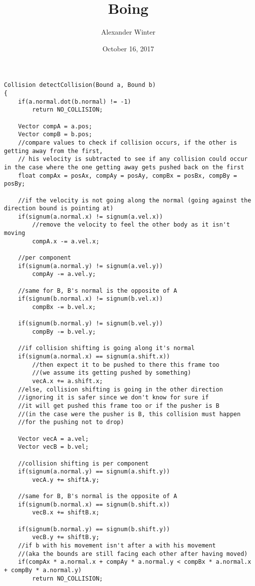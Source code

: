 \documentclass[12pt]{article}
\title{Boing}
\author{Alexander Winter}
\date{October 16, 2017}
\begin{document}
\maketitle
	
\newpage

\begin{lstlisting}
Collision detectCollision(Bound a, Bound b)
{
	if(a.normal.dot(b.normal) != -1)
		return NO_COLLISION;
	
	Vector compA = a.pos;
	Vector compB = b.pos;
	//compare values to check if collision occurs, if the other is getting away from the first,
	// his velocity is subtracted to see if any collision could occur in the case where the one getting away gets pushed back on the first
	float compAx = posAx, compAy = posAy, compBx = posBx, compBy = posBy;

	//if the velocity is not going along the normal (going against the direction bound is pointing at)
	if(signum(a.normal.x) != signum(a.vel.x))
		//remove the velocity to feel the other body as it isn't moving
		compA.x -= a.vel.x;

	//per component
	if(signum(a.normal.y) != signum(a.vel.y))
		compAy -= a.vel.y;

	//same for B, B's normal is the opposite of A
	if(signum(b.normal.x) != signum(b.vel.x))
		compBx -= b.vel.x;

	if(signum(b.normal.y) != signum(b.vel.y))
		compBy -= b.vel.y;

	//if collision shifting is going along it's normal
	if(signum(a.normal.x) == signum(a.shift.x))
		//then expect it to be pushed to there this frame too
		//(we assume its getting pushed by something)
		vecA.x += a.shift.x;
	//else, collision shifting is going in the other direction
	//ignoring it is safer since we don't know for sure if
	//it will get pushed this frame too or if the pusher is B
	//(in the case were the pusher is B, this collision must happen
	//for the pushing not to drop)
	
	Vector vecA = a.vel;
	Vector vecB = b.vel;
	
	//collision shifting is per component
	if(signum(a.normal.y) == signum(a.shift.y))
		vecA.y += shiftA.y;

	//same for B, B's normal is the opposite of A
	if(signum(b.normal.x) == signum(b.shift.x))
		vecB.x += shiftB.x;

	if(signum(b.normal.y) == signum(b.shift.y))
		vecB.y += shiftB.y;
	//if b with his movement isn't after a with his movement
	//(aka the bounds are still facing each other after having moved)
	if(compAx * a.normal.x + compAy * a.normal.y < compBx * a.normal.x + compBy * a.normal.y)
		return NO_COLLISION;


\end{lstlisting}
\end{document}
